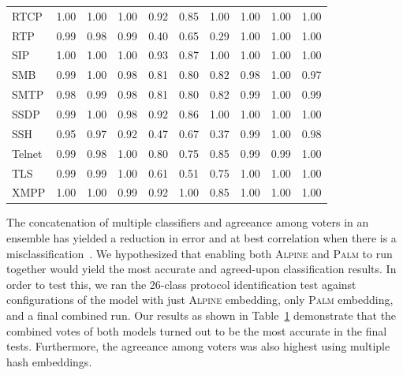 \begin{table}
\begin{tabular}{| p{2cm} | p{0.6cm} p{0.6cm} p{0.6cm} || p{0.6cm} p{0.6cm} p{0.6cm} || p{0.6cm} p{0.6cm} p{0.6cm}|}
 RTCP & 1.00 & 1.00 & 1.00 & 0.92 & 0.85 & 1.00 & 1.00 & 1.00 & 1.00 \\
 RTP & 0.99 & 0.98 & 0.99 & 0.40 & 0.65 & 0.29 & 1.00 & 1.00 & 1.00 \\
 SIP & 1.00 & 1.00 & 1.00 & 0.93 & 0.87 & 1.00 & 1.00 & 1.00 & 1.00 \\
 SMB & 0.99 & 1.00 & 0.98 & 0.81 & 0.80 & 0.82 & 0.98 & 1.00 & 0.97 \\
 SMTP & 0.98 & 0.99 & 0.98 & 0.81 & 0.80 & 0.82 & 0.99 & 1.00 & 0.99 \\
 SSDP & 0.99 & 1.00 & 0.98 & 0.92 & 0.86 & 1.00 & 1.00 & 1.00 & 1.00 \\
 SSH & 0.95 & 0.97 & 0.92 & 0.47 & 0.67 & 0.37 & 0.99 & 1.00 & 0.98 \\
 Telnet & 0.99 & 0.98 & 1.00 & 0.80 & 0.75 & 0.85 & 0.99 & 0.99 & 1.00 \\
 TLS & 0.99 & 0.99 & 1.00 & 0.61 & 0.51 & 0.75 & 1.00 & 1.00 & 1.00 \\
 XMPP & 1.00 & 1.00 & 0.99 & 0.92 & 1.00 & 0.85 & 1.00 & 1.00 & 1.00 \\
 \hline
\end{tabular}
\label{table:embeddingresults}
\end{table}

The concatenation of multiple classifiers and agreeance among voters in an ensemble has yielded a reduction in error and at best correlation when there is a misclassification~\cite{tumerensemble}. We hypothesized that enabling both \textsc{Alpine} and \textsc{Palm} to run together would yield the most accurate and agreed-upon classification results. In order to test this, we ran the 26-class protocol identification test against configurations of the model with just \textsc{Alpine} embedding, only \textsc{Palm} embedding, and a final combined run. Our results as shown in Table~\ref{table:embeddingresults} demonstrate that the combined votes of both models turned out to be the most accurate in the final tests. Furthermore, the agreeance among voters was also highest using multiple hash embeddings.

